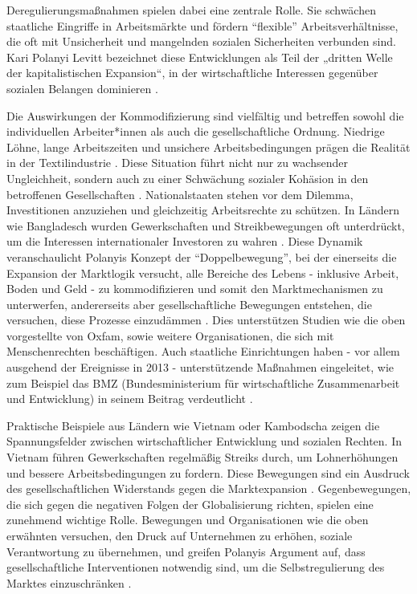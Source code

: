 \documentclass[12pt]{article}
\begin{document}
Deregulierungsmaßnahmen spielen dabei eine zentrale Rolle. Sie schwächen staatliche Eingriffe in Arbeitsmärkte und fördern \enquote{flexible} Arbeitsverhältnisse, die oft mit Unsicherheit und mangelnden sozialen Sicherheiten verbunden sind. Kari Polanyi Levitt bezeichnet diese Entwicklungen als Teil der „dritten Welle der kapitalistischen Expansion“, in der wirtschaftliche Interessen gegenüber sozialen Belangen dominieren \autocite[123]{polanyi_levitt_transformations_2019}.

Die Auswirkungen der Kommodifizierung sind vielfältig und betreffen sowohl die individuellen Arbeiter*innen als auch die gesellschaftliche Ordnung. Niedrige Löhne, lange Arbeitszeiten und unsichere Arbeitsbedingungen prägen die Realität in der Textilindustrie \autocite[vgl.][]{che_berberich_dunkle_2016}. Diese Situation führt nicht nur zu wachsender Ungleichheit, sondern auch zu einer Schwächung sozialer Kohäsion in den betroffenen Gesellschaften \autocite[182]{ebner_karl_2021}.
Nationalstaaten stehen vor dem Dilemma, Investitionen anzuziehen und gleichzeitig Arbeitsrechte zu schützen. In Ländern wie Bangladesch wurden Gewerkschaften und Streikbewegungen oft unterdrückt, um die Interessen internationaler Investoren zu wahren \Autocite[vgl.][121]{polanyi_levitt_transformations_2019}. Diese Dynamik veranschaulicht Polanyis Konzept der \enquote{Doppelbewegung}, bei der einerseits die Expansion der Marktlogik versucht, alle Bereiche des Lebens - inklusive Arbeit, Boden und Geld - zu kommodifizieren und somit den Marktmechanismen zu unterwerfen, andererseits aber gesellschaftliche Bewegungen entstehen, die versuchen, diese Prozesse einzudämmen \autocite[182]{ebner_karl_2021}. Dies unterstützen Studien wie die oben vorgestellte von Oxfam, sowie weitere Organisationen, die sich mit Menschenrechten beschäftigen. Auch staatliche Einrichtungen haben - vor allem ausgehend der Ereignisse in 2013 - unterstützende Maßnahmen eingeleitet, wie zum Beispiel das BMZ (Bundesministerium für wirtschaftliche Zusammenarbeit und Entwicklung) in seinem Beitrag verdeutlicht \Autocite[vgl.][]{bmz_umwelt-_2024}. 

Praktische Beispiele aus Ländern wie Vietnam oder Kambodscha zeigen die Spannungsfelder zwischen wirtschaftlicher Entwicklung und sozialen Rechten. In Vietnam führen Gewerkschaften regelmäßig Streiks durch, um Lohnerhöhungen und bessere Arbeitsbedingungen zu fordern. Diese Bewegungen sind ein Ausdruck des gesellschaftlichen Widerstands gegen die Marktexpansion \autocite[vgl.][]{deutsche_welle_vietnam_2015}.
Gegenbewegungen, die sich gegen die negativen Folgen der Globalisierung richten, spielen eine zunehmend wichtige Rolle. Bewegungen und Organisationen wie die oben erwähnten versuchen, den Druck auf Unternehmen zu erhöhen, soziale Verantwortung zu übernehmen, und greifen Polanyis Argument auf, dass gesellschaftliche Interventionen notwendig sind, um die Selbstregulierung des Marktes einzuschränken \Autocite[127]{polanyi_levitt_transformations_2019}.
\end{document}
